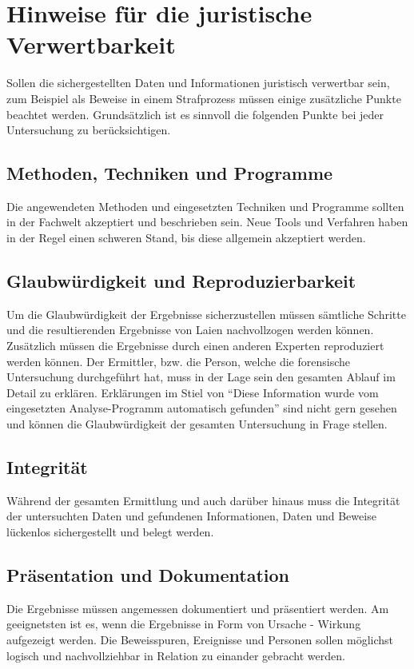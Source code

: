 \section{Hinweise für die juristische Verwertbarkeit}
Sollen die sichergestellten Daten und Informationen juristisch verwertbar sein, zum Beispiel als Beweise in einem Strafprozess müssen einige zusätzliche Punkte beachtet werden. Grundsätzlich ist es sinnvoll die folgenden Punkte bei jeder Untersuchung zu berücksichtigen.

\subsection{Methoden, Techniken und Programme}
Die angewendeten Methoden und eingesetzten Techniken und Programme sollten in der Fachwelt akzeptiert und beschrieben sein. Neue Tools und Verfahren haben in der Regel einen schweren Stand, bis diese allgemein akzeptiert werden.

\subsection{Glaubwürdigkeit und Reproduzierbarkeit}
Um die Glaubwürdigkeit der Ergebnisse sicherzustellen müssen sämtliche Schritte und die resultierenden Ergebnisse von Laien nachvollzogen werden können. Zusätzlich müssen die Ergebnisse durch einen anderen Experten reproduziert werden können. Der Ermittler, bzw. die Person, welche die forensische Untersuchung durchgeführt hat, muss in der Lage sein den gesamten Ablauf im Detail zu erklären. Erklärungen im Stiel von "`Diese Information wurde vom eingesetzten Analyse-Programm automatisch gefunden"' sind nicht gern gesehen und können die Glaubwürdigkeit der gesamten Untersuchung in Frage stellen.


\subsection{Integrität}
Während der gesamten Ermittlung und auch darüber hinaus muss die Integrität der untersuchten Daten und gefundenen Informationen, Daten und Beweise lückenlos sichergestellt und belegt werden. 

\subsection{Präsentation und Dokumentation}
Die Ergebnisse müssen angemessen dokumentiert und präsentiert werden. Am geeignetsten ist es, wenn die Ergebnisse in Form von Ursache - Wirkung aufgezeigt werden. Die Beweisspuren, Ereignisse und Personen sollen möglichst logisch und nachvollziehbar in Relation zu einander gebracht werden.

